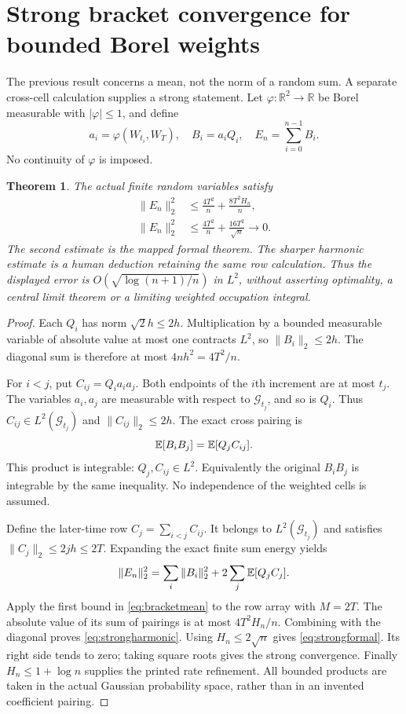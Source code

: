 \documentclass[11pt]{article}
\newtheorem{theorem}{Theorem}[section]
\begin{document}
\section{Strong bracket convergence for bounded Borel weights}
The previous result concerns a mean, not the norm of a random sum.
A separate cross-cell calculation supplies a strong statement. Let
$\varphi:\mathbb R^2\to\mathbb R$ be Borel measurable with
$|\varphi|\le1$, and define
\[
 a_i=\varphi(W_{t_i},W_T),\quad B_i=a_iQ_i,\quad
 E_n=\sum_{i=0}^{n-1}B_i.
\]
No continuity of $\varphi$ is imposed.
\begin{theorem}\label{thm:strongbracket}
The actual finite random variables satisfy
\begin{align}
 \|E_n\|_2^2
 &\le \frac{4T^2}{n}+\frac{8T^2 H_n}{n},\label{eq:strongharmonic}\\
 \|E_n\|_2^2
 &\le \frac{4T^2}{n}+\frac{16T^2}{\sqrt n}\longrightarrow0.
 \label{eq:strongformal}
\end{align}
The second estimate is the mapped formal theorem. The sharper harmonic
estimate is a human deduction retaining the same row calculation.
Thus the displayed error is $O(\sqrt{\log(n+1)/n})$ in $L^2$, without
asserting optimality, a central limit theorem or a limiting weighted
occupation integral.
\end{theorem}
\begin{proof}
Each $Q_i$ has norm $\sqrt2h\le2h$. Multiplication by a bounded
measurable variable of absolute value at most one contracts $L^2$,
so $\|B_i\|_2\le2h$. The diagonal sum is therefore at most
$4nh^2=4T^2/n$.

For $i<j$, put $C_{ij}=Q_i a_i a_j$. Both endpoints of the $i$th
increment are at most $t_j$. The variables $a_i,a_j$ are measurable
with respect to $\mathcal G_{t_j}$, and so is $Q_i$. Thus
$C_{ij}\in L^2(\mathcal G_{t_j})$ and
$\|C_{ij}\|_2\le2h$. The exact cross pairing is
\[
 \mathbb E[B_iB_j]=\mathbb E[Q_j C_{ij}].
\]
This product is integrable: $Q_j,C_{ij}\in L^2$. Equivalently the
original $B_iB_j$ is integrable by the same inequality. No independence
of the weighted cells is assumed.

Define the later-time row $C_j=\sum_{i<j}C_{ij}$. It belongs to
$L^2(\mathcal G_{t_j})$ and satisfies
$\|C_j\|_2\le2jh\le2T$. Expanding the exact finite sum energy yields
\[
 \|E_n\|_2^2=\sum_i\|B_i\|_2^2+2\sum_j\mathbb E[Q_jC_j].
\]
Apply the first bound in \eqref{eq:bracketmean} to the row array with
$M=2T$. The absolute value of its sum of pairings is at most
$4T^2H_n/n$. Combining with the diagonal proves
\eqref{eq:strongharmonic}. Using $H_n\le2\sqrt n$ gives
\eqref{eq:strongformal}. Its right side tends to zero; taking square
roots gives the strong convergence. Finally $H_n\le1+\log n$ supplies
the printed rate refinement. All bounded products are taken in the
actual Gaussian probability space, rather than in an invented
coefficient pairing.
\end{proof}
\end{document}

